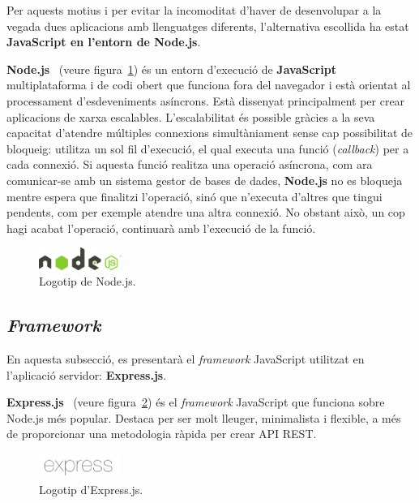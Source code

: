 \documentclass[a4paper,12pt]{ThesisStyle}
\begin{document}
Per aquests motius i per evitar la incomoditat d'haver de desenvolupar a la vegada dues aplicacions amb llenguatges diferents, l'alternativa escollida ha estat \textbf{JavaScript en l'entorn de Node.js}.

\textbf{Node.js}~\cite{Node} (veure figura~\ref{img:logo_node}) és un entorn d'execució de \textbf{JavaScript} multiplataforma i de codi obert que funciona fora del navegador i està orientat al processament d'esdeveniments asíncrons. Està dissenyat principalment per crear aplicacions de xarxa escalables. L'escalabilitat és possible gràcies a la seva capacitat d'atendre múltiples connexions simultàniament sense cap possibilitat de bloqueig: utilitza un sol fil d'execució, el qual executa una funció (\textit{callback}) per a cada connexió. Si aquesta funció realitza una operació asíncrona, com ara comunicar-se amb un sistema gestor de bases de dades, \textbf{Node.js} no es bloqueja mentre espera que finalitzi l'operació, sinó que n'executa d'altres que tingui pendents, com per exemple atendre una altra connexió. No obstant això, un cop hagi acabat l'operació, continuarà amb l'execució de la funció.

\begin{figure}[H]
  \centering
  \includegraphics[width=0.24\textwidth]{assets/logos/Node.png}
  \caption{\label{img:logo_node}Logotip de Node.js.}
\end{figure}

\subsection{\textit{Framework}}
\label{subsec:decisions_servidor_framework}

En aquesta subsecció, es presentarà el \textit{framework} JavaScript utilitzat en l'aplicació servidor: \textbf{Express.js}.

\textbf{Express.js}~\cite{Express} (veure figura~\ref{img:logo_express}) és el \textit{framework} JavaScript que funciona sobre Node.js més popular. Destaca per ser molt lleuger, minimalista i flexible, a més de proporcionar una metodologia ràpida per crear API REST.

\begin{figure}[H]
  \centering
  \includegraphics[width=0.24\textwidth]{assets/logos/Express.png}
  \caption{\label{img:logo_express}Logotip d'Express.js.}
\end{figure}
\end{document}
